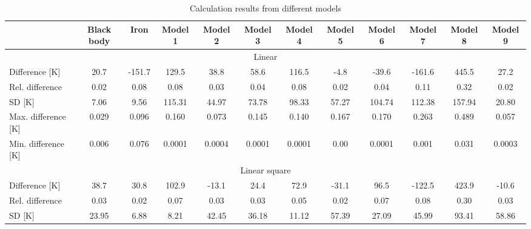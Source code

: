 {\linespread{1}
\begin{table}
    \centering
    \caption{Calculation results from different models}
    \label{tab: statistic_results}
    \begin{tabular}{lccccccccccc}
        \hline
        & \multicolumn{1}{c}{Black body} & \multicolumn{1}{c}{Iron} & Model 1 & Model 2 & Model 3 & Model 4 & Model 5 & Model 6 & Model 7 & Model 8 & Model 9 \\ \hline
        \multicolumn{12}{c}{Linear}                                                                                                                                                         \\ \hline
        Difference {[}K{]}      & 20.7                           & -151.7                        & 129.5   & 38.8    & 58.6    & 116.5   & -4.8    & -39.6   & -161.6  & 445.5   & 27.2     \\
        Rel. difference         & 0.02                           & 0.08                          & 0.08    & 0.03    & 0.04    & 0.08    & 0.02    & 0.04    & 0.11    & 0.32    & 0.02     \\
        SD {[}K{]}              & 7.06                           & 9.56                          & 115.31  & 44.97   & 73.78   & 98.33   & 57.27   & 104.74  & 112.38  & 157.94  & 20.80    \\
        Max. difference {[}K{]} & 0.029                          & 0.096                         & 0.160   & 0.073   & 0.145   & 0.140   & 0.167   & 0.170   & 0.263   & 0.489   & 0.057    \\
        Min. difference {[}K{]} & 0.006                          & 0.076                         & 0.0001  & 0.0004  & 0.0001  & 0.0001  & 0.00    & 0.0001  & 0.001   & 0.031   & 0.0003   \\ \hline
        \multicolumn{12}{c}{Linear square}                                                                                                                                                   \\ \hline
        Difference {[}K{]}      & 38.7                           & 30.8                          & 102.9   & -13.1   & 24.4    & 72.9    & -31.1   & 96.5    & -122.5  & 423.9   & -10.6   \\
        Rel. difference         & 0.03                           & 0.02                          & 0.07    & 0.03    & 0.03    & 0.05    & 0.02    & 0.07    & 0.08    & 0.30    & 0.03    \\
        SD {[}K{]}              & 23.95                          & 6.88                          & 8.21    & 42.45   & 36.18   & 11.12   & 57.39   & 27.09   & 45.99   & 93.41   & 58.86   \\

\end{tabular}
\end{table}}
